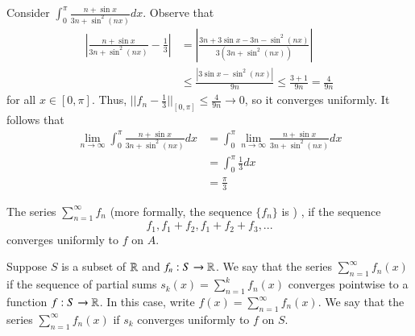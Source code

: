 \begin{eg}
    Consider $\int_0^{\pi}\frac{n+\sin x}{3n+\sin^2(nx)}dx$. Observe that \begin{align*}
        \left|\frac{n+\sin x}{3n+\sin^2(nx)} - \frac{1}{3}\right| &= \left|\frac{3n+3\sin x-3n-\sin^2(nx)}{3(3n+\sin^2(nx))}\right| \\
        &\leq \frac{|3\sin x - \sin^2(nx)|}{9n} \leq \frac{3+1}{9n} = \frac{4}{9n}
    \end{align*}
    for all $x \in [0,\pi]$. Thus, $||f_n-\frac{1}{3}||_{[0,\pi]} \leq \frac{4}{9n}\rightarrow 0$, so it converges uniformly. It follows that \begin{align*}
        \lim\limits_{n\rightarrow \infty}\int_0^{\pi}\frac{n+\sin x}{3n+\sin^2(nx)}dx &= \int_0^{\pi}\lim\limits_{n\rightarrow \infty}\frac{n+\sin x}{3n+\sin^2(nx)}dx \\
        &= \int_0^{\pi}\frac{1}{3}dx \\
        &= \frac{\pi}{3}
    \end{align*}
\end{eg}

\begin{defn}
    The series $\sum\limits_{n=1}^{\infty}f_n$  (more formally, the sequence $\{f_n\}$ is ) , if the sequence \begin{equation*}
        f_1, f_1+f_2,f_1+f_2+f_3,...
    \end{equation*}
    converges uniformly to $f$ on $A$.
\end{defn}

\begin{defn}
    Suppose $S$ is a subset of $\mathbb R$ and $f_n:S\rightarrow \mathbb R$. We say that the series $\sum_{n=1}^{\infty}f_n(x)$  if the sequence of partial sums $s_k(x) = \sum_{n=1}^kf_n(x)$ converges pointwise to a function $f:S\rightarrow \mathbb R$. In this case, write $f(x) = \sum_{n=1}^{\infty}f_n(x)$. We say that the series $\sum_{n=1}^{\infty}f_n(x)$  if $s_k$ converges uniformly to $f$ on $S$.
\end{defn}



